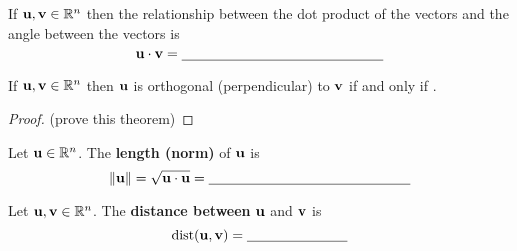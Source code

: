 \begin{definition}
    If ${\bf u},{\bf v}\in\mathbb{R}^n$ then the relationship between the dot product of the
    vectors and the angle between the vectors is
    \[ {\bf u} \cdot {\bf v} = \underline{\hspace{2in}} \]
\end{definition}
\solution{
$\bu \cdot \bv = \|\bu\| \|\bv\| \cos \theta$
}


\begin{thm}
    If ${\bf u},{\bf v}\in\mathbb{R}^n$ then ${\bf u}$ is orthogonal (perpendicular) to ${\bf v}$ if and
    only if \underline{\hspace{1in}}.
\end{thm}
\begin{proof}
    (prove this theorem)
\end{proof}

\begin{definition}
    Let ${\bf u} \in \mathbb{R}^n$.  The {\bf length (norm)} of ${\bf u}$ is
    \[ \| {\bf u} \| = \sqrt{{\bf u} \cdot {\bf u}} = \underline{\hspace{2in}} \]
\end{definition}

\begin{definition}
    Let ${\bf u},{\bf v}\in\mathbb{R}^n$.  The {\bf distance between} ${\bf u}$ and ${\bf v}$ is
    \[ \text{dist}({\bf u},{\bf v}) = \underline{\hspace{1in}} \]
\end{definition}


